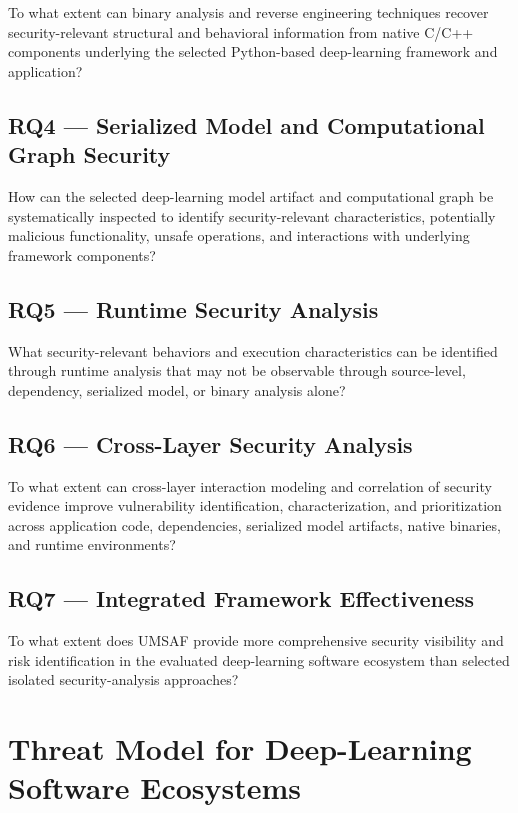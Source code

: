 \documentclass[
  12pt,
  letterpaper,
  oneside]{report}
\begin{document}
To what extent can binary analysis and reverse engineering techniques
recover security-relevant structural and behavioral information from
native C/C++ components underlying the selected Python-based
deep-learning framework and application?

\section{RQ4 --- Serialized Model and Computational Graph
Security}\label{rq4--serialized-model-and-computational-graph-security}

How can the selected deep-learning model artifact and computational
graph be systematically inspected to identify security-relevant
characteristics, potentially malicious functionality, unsafe operations,
and interactions with underlying framework components?

\section{RQ5 --- Runtime Security
Analysis}\label{rq5--runtime-security-analysis}

What security-relevant behaviors and execution characteristics can be
identified through runtime analysis that may not be observable through
source-level, dependency, serialized model, or binary analysis alone?

\section{RQ6 --- Cross-Layer Security
Analysis}\label{rq6--cross-layer-security-analysis}

To what extent can cross-layer interaction modeling and correlation of
security evidence improve vulnerability identification,
characterization, and prioritization across application code,
dependencies, serialized model artifacts, native binaries, and runtime
environments?

\section{RQ7 --- Integrated Framework
Effectiveness}\label{rq7--integrated-framework-effectiveness}

To what extent does UMSAF provide more comprehensive security visibility
and risk identification in the evaluated deep-learning software
ecosystem than selected isolated security-analysis approaches?

\chapter{Threat Model for Deep-Learning Software Ecosystems}\label{6-threat-model-for-deep-learning-software-ecosystems}
\end{document}
